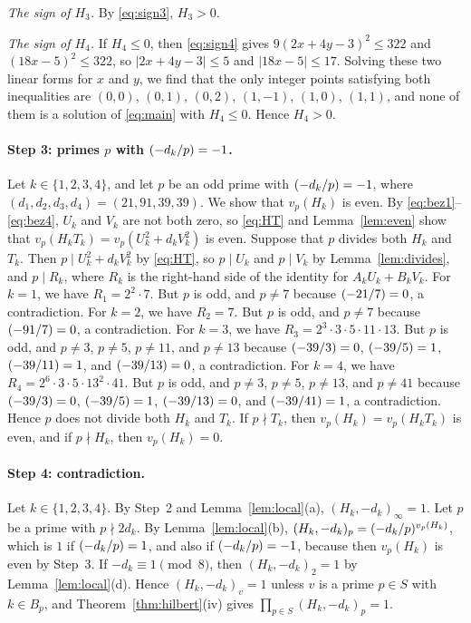 \documentclass[11pt]{article}
\newcommand{\leg}[2]{\mathchoice{\biggl(\dfrac{#1}{#2}\biggr)}{(#1/#2)}{(#1/#2)}{(#1/#2)}}
\begin{document}
\emph{The sign of $H_{3}$.} By \eqref{eq:sign3}, $H_{3}>0$.

\emph{The sign of $H_{4}$.} If $H_{4}\leq0$, then \eqref{eq:sign4} gives $9(2x+4y-3)^2\leq 322$ and $(18x-5)^2\leq 322$, so $|2x+4y-3|\leq5$ and $|18x-5|\leq17$. Solving these two linear forms for $x$ and $y$, we find that the only integer points satisfying both inequalities are $(0,0)$, $(0,1)$, $(0,2)$, $(1,-1)$, $(1,0)$, $(1,1)$, and none of them is a solution of \eqref{eq:main} with $H_{4}\leq0$. Hence $H_{4}>0$.

\paragraph{Step 3: primes $p$ with $\leg{-d_k}{p}=-1$.} Let $k\in\{1,2,3,4\}$, and let $p$ be an odd prime with $\leg{-d_k}{p}=-1$, where $(d_{1},d_{2},d_{3},d_{4})=(21,91,39,39)$. We show that $v_p(H_k)$ is even. By \eqref{eq:bez1}--\eqref{eq:bez4}, $U_k$ and $V_k$ are not both zero, so \eqref{eq:HT} and Lemma~\ref{lem:even} show that $v_p(H_kT_k)=v_p(U_k^2+d_kV_k^2)$ is even. Suppose that $p$ divides both $H_k$ and $T_k$. Then $p\mid U_k^2+d_kV_k^2$ by \eqref{eq:HT}, so $p\mid U_k$ and $p\mid V_k$ by Lemma~\ref{lem:divides}, and $p\mid R_k$, where $R_k$ is the right-hand side of the identity for $A_kU_k+B_kV_k$. For $k=1$, we have $R_{1}=2^{2}\cdot 7$. But $p$ is odd, and $p\neq7$ because $\leg{-21}{7}=0$, a contradiction. For $k=2$, we have $R_{2}=7$. But $p$ is odd, and $p\neq7$ because $\leg{-91}{7}=0$, a contradiction. For $k=3$, we have $R_{3}=2^{3}\cdot 3\cdot 5\cdot 11\cdot 13$. But $p$ is odd, and $p\neq3$, $p\neq5$, $p\neq11$, and $p\neq13$ because $\leg{-39}{3}=0$, $\leg{-39}{5}=1$, $\leg{-39}{11}=1$, and $\leg{-39}{13}=0$, a contradiction. For $k=4$, we have $R_{4}=2^{6}\cdot 3\cdot 5\cdot 13^{2}\cdot 41$. But $p$ is odd, and $p\neq3$, $p\neq5$, $p\neq13$, and $p\neq41$ because $\leg{-39}{3}=0$, $\leg{-39}{5}=1$, $\leg{-39}{13}=0$, and $\leg{-39}{41}=1$, a contradiction. Hence $p$ does not divide both $H_k$ and $T_k$. If $p\nmid T_k$, then $v_p(H_k)=v_p(H_kT_k)$ is even, and if $p\nmid H_k$, then $v_p(H_k)=0$.

\paragraph{Step 4: contradiction.} Let $k\in\{1,2,3,4\}$. By Step~2 and Lemma~\ref{lem:local}(a), $(H_k,-d_k)_\infty=1$. Let $p$ be a prime with $p\nmid2d_k$. By Lemma~\ref{lem:local}(b), $(H_k,-d_k)_p=\leg{-d_k}{p}^{v_p(H_k)}$, which is $1$ if $\leg{-d_k}{p}=1$, and also if $\leg{-d_k}{p}=-1$, because then $v_p(H_k)$ is even by Step~3. If $-d_k\equiv1\pmod8$, then $(H_k,-d_k)_2=1$ by Lemma~\ref{lem:local}(d). Hence $(H_k,-d_k)_v=1$ unless $v$ is a prime $p\in S$ with $k\in B_p$, and Theorem~\ref{thm:hilbert}(iv) gives $\prod_{p\in S}(H_k,-d_k)_p=1$.
\end{document}
